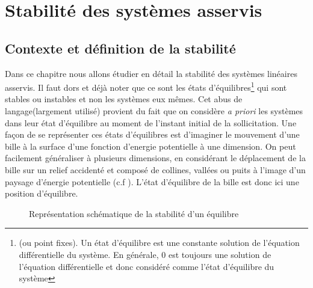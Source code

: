 \chapter{Stabilité des systèmes asservis\label{chap-stab}}
\minitoc
\newpage
\section{Contexte et définition de la stabilité} 
Dans ce chapitre nous allons étudier en détail la stabilité des systèmes
linéaires asservis. Il faut dors et déjà noter que ce sont les états 
d'équilibres\footnote{(ou point fixes). Un état d'équilibre est une constante
solution de l'équation différentielle du système. En générale, 0 est toujours
une solution de l'équation différentielle et donc considéré comme l'état 
d'équilibre du système} qui sont stables ou instables et non les systèmes eux 
mêmes. Cet \og abus de langage\fg (largement utilisé) provient du fait que 
on considère \emph{a priori} les systèmes dans leur état d'équilibre 
au moment de l'instant initial de la sollicitation. 
Une façon de se représenter ces états d'équilibres est d'imaginer le 
mouvement d'une bille à la surface d'une fonction d'energie potentielle à une 
dimension. 
On peut facilement généraliser à plusieurs dimensions, en considérant le 
déplacement de la bille sur un relief accidenté et composé de collines, 
vallées ou puits à l'image d'un paysage d'énergie potentielle 
(c.f ). L'état d'équilibre de la bille est donc ici 
une position d'équilibre.
\begin{figure}[!h]
    \centering
    
    \caption{Représentation schématique de la stabilité d'un équilibre
             \label{fig-stab}}
\end{figure}

